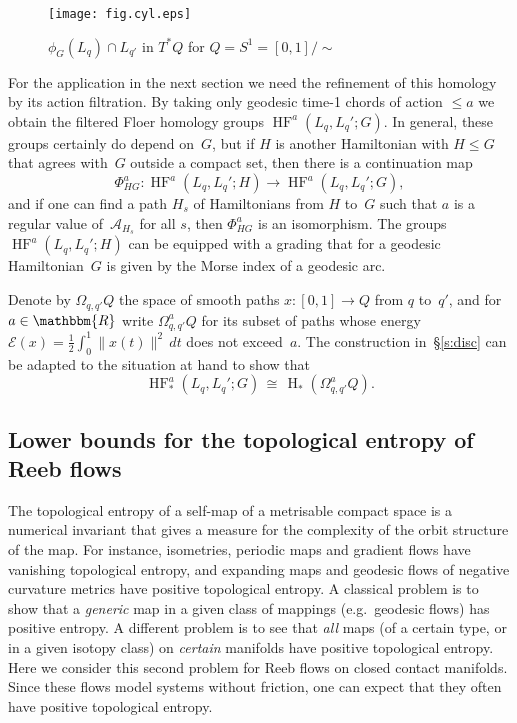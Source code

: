 \documentclass[12pt,twoside]{amsart}
\theoremstyle{plain}
\numberwithin{figure}{section}
\numberwithin{equation}{section}
\def\H{\operatorname{H}}
\def\HF{\operatorname{HF}}
\def\ca{{\mathcal A}}
\def\ce{{\mathcal E}}
\def\RR{\mathbbm{R}}
\begin{document}
%
\begin{figure}[h]   
 \begin{center} 
  \leavevmode\texttt{[image: fig.cyl.eps]}
 \end{center}
 \caption{$\phi_G (L_q) \cap L_{q'}$ in $T^*Q$ for $Q = S^1 = [0,1]/\sim$}
 \label{fig:cyl}
\end{figure}
%


For the application in the next section we need the refinement of this homology by its action filtration.
By taking only geodesic time-1 chords of action $\leqslant a$ we obtain 
the filtered Floer homology groups $\HF^a (L_q,L_q';G)$. 
In general, these groups certainly do depend on~$G$, 
but if $H$ is another Hamiltonian with $H \leqslant G$ that agrees with~$G$ outside a compact set,
then there is a continuation map 
%
\begin{equation} \label{e:Phi}
\Phi_{HG}^a \colon \HF^a (L_q,L_q';H) \to \HF^a (L_q,L_q';G) ,
\end{equation}
%
and if one can find a path $H_s$ of Hamiltonians from $H$ to~$G$ such that $a$ 
is a regular value of~$\ca_{H_s}$ for all $s$, then $\Phi_{HG}^a$ is an isomorphism.
The groups $\HF^a (L_q,L_q';H)$ can be equipped with a grading that for a geodesic Hamiltonian~$G$ 
is given by the Morse index of a geodesic arc.

Denote by $\Omega_{q,q'}Q$ the space of smooth paths $x \colon [0,1] \to Q$ from $q$ to~$q'$, 
and for $a \in \RR$ write $\Omega^a_{q,q'}Q$
for its subset of paths whose energy 
$\ce (x) = \frac 12 \int_0^1 \|x(t) \|^2 \,dt$ does not exceed~$a$.
The construction in~\S \ref{s:disc} can be adapted to the situation at hand to show that
\begin{equation} \label{iso:based}
\HF^a_* (L_q,L_q';G) \,\cong\, \H_* (\Omega^a_{q,q'}Q) .
\end{equation}


\subsection{Lower bounds for the topological entropy of Reeb flows}
\label{s:entropy}

The topological entropy of a self-map of a metrisable compact space
is a numerical invariant that gives a measure for 
the complexity of the orbit structure of the map.
%
For instance, isometries, periodic maps and gradient flows have vanishing topological entropy, 
and expanding maps and geodesic flows of negative curvature metrics have positive topological entropy.
A classical problem is to show that a {\it generic}\/ map in a given class of mappings (e.g.\ geodesic flows) 
has positive entropy. A different problem is to see that {\it all}\/ maps 
(of a certain type, or in a given isotopy class) on {\it certain}\/ manifolds have positive topological entropy.
Here we consider this second problem for Reeb flows on closed contact manifolds.
Since these flows model systems without friction, one can expect that they
often have positive topological entropy. 
\end{document}
